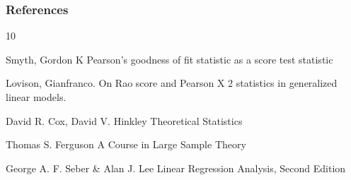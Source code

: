 \documentclass{beamer}
\begin{document}
\begin{frame}[allowframebreaks]
  \frametitle{References}    
  \begin{thebibliography}{10}    

  \beamertemplatearticlebibitems
    Smyth, Gordon K
    \newblock Pearson's goodness of fit statistic as a score test statistic
    
      \beamertemplatearticlebibitems
   Lovison, Gianfranco. 
    \newblock On Rao score and Pearson X 2 statistics in generalized linear models.
    
      \beamertemplatearticlebibitems
    David R. Cox, David V. Hinkley
    \newblock Theoretical Statistics
    
       \beamertemplatearticlebibitems
    Thomas S. Ferguson
    \newblock A Course in Large Sample Theory
    
         \beamertemplatearticlebibitems
    George A. F. Seber \& Alan J. Lee
    \newblock Linear Regression Analysis, Second Edition

%    
%    
    
%    
%    
    
    
  \end{thebibliography}
\end{frame}
\end{document}
